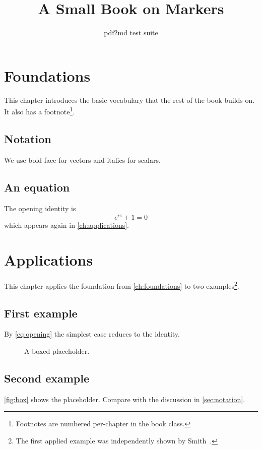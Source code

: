 \documentclass{book}
\title{A Small Book on Markers}
\author{pdf2md test suite}
\date{}
\begin{document}
\maketitle
\tableofcontents

\chapter{Foundations}\label{ch:foundations}

This chapter introduces the basic vocabulary that the rest of the book
builds on. It also has a footnote\footnote{Footnotes are numbered
per-chapter in the book class.}.

\section{Notation}\label{sec:notation}
We use bold-face for vectors and italics for scalars.

\section{An equation}\label{sec:eq}
The opening identity is
\begin{equation}\label{eq:opening}
e^{i\pi} + 1 = 0
\end{equation}
which appears again in \autoref{ch:applications}.

\chapter{Applications}\label{ch:applications}

This chapter applies the foundation from \autoref{ch:foundations} to
two examples\footnote{The first applied example was independently
shown by Smith~\cite{smith2020}.}.

\section{First example}\label{sec:first}
By \autoref{eq:opening} the simplest case reduces to the identity.

\begin{figure}[h]
\centering
\fbox{\rule{0pt}{0.8in}\rule{1.5in}{0pt}}
\caption{A boxed placeholder.}\label{fig:box}
\end{figure}

\section{Second example}\label{sec:second}
\autoref{fig:box} shows the placeholder. Compare with the discussion
in \autoref{sec:notation}.
\end{document}
